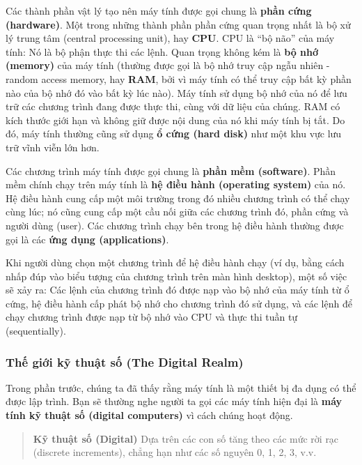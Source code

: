 Các thành phần vật lý tạo nên máy tính được gọi chung là \textbf{phần
cứng (hardware)}. Một trong những thành phần phần cứng quan trọng nhất
là bộ xử lý trung tâm (central processing unit), hay \textbf{CPU}. CPU
là ``bộ não'' của máy tính: Nó là bộ phận thực thi các lệnh. Quan trọng
không kém là \textbf{bộ nhớ (memory)} của máy tính (thường được gọi là
bộ nhớ truy cập ngẫu nhiên - random access memory, hay \textbf{RAM}, bởi
vì máy tính có thể truy cập bất kỳ phần nào của bộ nhớ đó vào bất kỳ lúc
nào). Máy tính sử dụng bộ nhớ của nó để lưu trữ các chương trình đang
được thực thi, cùng với dữ liệu của chúng. RAM có kích thước giới hạn và
không giữ được nội dung của nó khi máy tính bị tắt. Do đó, máy tính
thường cũng sử dụng \textbf{ổ cứng (hard disk)} như một khu vực lưu trữ
vĩnh viễn lớn hơn.

Các chương trình máy tính được gọi chung là \textbf{phần mềm
(software)}. Phần mềm chính chạy trên máy tính là \textbf{hệ điều hành
(operating system)} của nó. Hệ điều hành cung cấp một môi trường trong
đó nhiều chương trình có thể chạy cùng lúc; nó cũng cung cấp một cầu nối
giữa các chương trình đó, phần cứng và người dùng (user). Các chương
trình chạy bên trong hệ điều hành thường được gọi là các \textbf{ứng
dụng (applications)}.

Khi người dùng chọn một chương trình để hệ điều hành chạy (ví dụ, bằng
cách nhấp đúp vào biểu tượng của chương trình trên màn hình desktop),
một số việc sẽ xảy ra: Các lệnh của chương trình đó được nạp vào bộ nhớ
của máy tính từ ổ cứng, hệ điều hành cấp phát bộ nhớ cho chương trình đó
sử dụng, và các lệnh để chạy chương trình được nạp từ bộ nhớ vào CPU và
thực thi tuần tự (sequentially).

\subsubsection{Thế giới kỹ thuật số (The Digital
Realm)}\label{thux1ebf-giux1edbi-kux1ef9-thuux1eadt-sux1ed1-the-digital-realm}

Trong phần trước, chúng ta đã thấy rằng máy tính là một thiết bị đa dụng
có thể được lập trình. Bạn sẽ thường nghe người ta gọi các máy tính hiện
đại là \textbf{máy tính kỹ thuật số (digital computers)} vì cách chúng
hoạt động.

\begin{quote}
\textbf{Kỹ thuật số (Digital)} Dựa trên các con số tăng theo các mức rời
rạc (discrete increments), chẳng hạn như các số nguyên 0, 1, 2, 3, v.v.
\end{quote}

